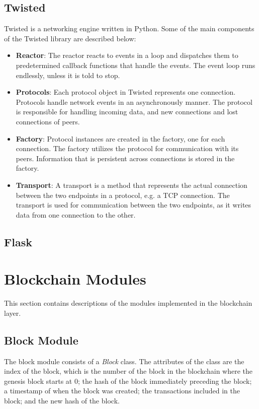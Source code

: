 \subsection{Twisted}
Twisted \cite{twisted} is a networking engine written in Python.
Some of the main components of the Twisted library are described below:
\begin{itemize}
\item \textbf{Reactor}: The reactor reacts to events in a loop and dispatches them to predetermined callback functions that handle the events. The event loop runs endlessly, unless it is told to stop. 

\item \textbf{Protocols}: Each protocol object in Twisted represents one connection. Protocols handle network events in an asynchronously manner. The protocol is responsible for handling incoming data, and new connections and lost connections of peers.

\item \textbf{Factory}: Protocol instances are created in the factory, one for each connection. The factory utilizes the protocol for communication with its peers. Information that is persistent across connections is stored in the factory.

\item \textbf{Transport}: A transport is a method that represents the actual connection between the two endpoints in a protocol, e.g. a TCP connection. The transport is used for communication between the two endpoints, as it writes data from one connection to the other.
\end{itemize}

\subsection{Flask}

\section{Blockchain Modules}
This section contains descriptions of the modules implemented in the blockchain layer.

\subsection{Block Module}
The block module consists of a \textit{Block} class. The attributes of the class are the index of the block, which is the number of the block in the blockchain where the genesis block starts at 0; the hash of the block immediately preceding the block; a timestamp of when the block was created; the transactions included in the block; and the new hash of the block. 

